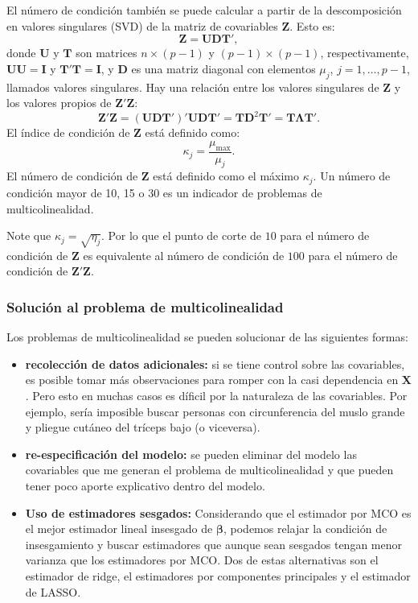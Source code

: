 \documentclass[
]{article}
\begin{document}
El número de condición también se puede calcular a partir de la descomposición en valores singulares (SVD) de la matriz de covariables \(\boldsymbol Z\). Esto es:
\[
\boldsymbol Z=\boldsymbol U\boldsymbol D\boldsymbol T',
\]
donde \(\boldsymbol U\) y \(\boldsymbol T\) son matrices \(n\times (p-1)\) y \((p-1)\times (p-1)\), respectivamente, \(\boldsymbol U\boldsymbol U= \boldsymbol I\) y \(\boldsymbol T'\boldsymbol T= \boldsymbol I\), y \(\boldsymbol D\) es una matriz diagonal con elementos \(\mu_{j}\), \(j=1,\ldots,p-1\), llamados valores singulares. Hay una relación entre los valores singulares de \(\boldsymbol Z\) y los valores propios de \(\boldsymbol Z'\boldsymbol Z\):
\[
\boldsymbol Z'\boldsymbol Z= (\boldsymbol U\boldsymbol D\boldsymbol T')'\boldsymbol U\boldsymbol D\boldsymbol T' = \boldsymbol T\boldsymbol D^2\boldsymbol T' = \boldsymbol T\boldsymbol \Lambda\boldsymbol T'.
\]
El índice de condición de \(\boldsymbol Z\) está definido como:
\[
\kappa_{j} = \frac{\mu_{\mbox{max}}}{\mu_{j}}.
\]
El número de condición de \(\boldsymbol Z\) está definido como el máximo \(\kappa_{j}\). Un número de condición mayor de 10, 15 o 30 es un indicador de problemas de multicolinealidad.

Note que \(\kappa_{j} = \sqrt{\eta_{j}}\). Por lo que el punto de corte de \(10\) para el número de condición de \(\boldsymbol Z\) es equivalente al número de condición de \(100\) para el número de condición de \(\boldsymbol Z'\boldsymbol Z\).

\subsubsection{Solución al problema de multicolinealidad}\label{soluciuxf3n-al-problema-de-multicolinealidad}

Los problemas de multicolinealidad se pueden solucionar de las siguientes formas:

\begin{itemize}
\item
  \textbf{recolección de datos adicionales:} si se tiene control sobre las covariables, es posible tomar más observaciones para romper con la casi dependencia en \(\boldsymbol X\). Pero esto en muchas casos es díficil por la naturaleza de las covariables. Por ejemplo, sería imposible buscar personas con circunferencia del muslo grande y pliegue cutáneo del tríceps bajo (o viceversa).
\item
  \textbf{re-especificación del modelo:} se pueden eliminar del modelo las covariables que me generan el problema de multicolinealidad y que pueden tener poco aporte explicativo dentro del modelo.
\item
  \textbf{Uso de estimadores sesgados:} Considerando que el estimador por MCO es el mejor estimador lineal insesgado de \(\boldsymbol \beta\), podemos relajar la condición de insesgamiento y buscar estimadores que aunque sean sesgados tengan menor varianza que los estimadores por MCO. Dos de estas alternativas son el estimador de ridge, el estimadores por componentes principales y el estimador de LASSO.
\end{itemize}
\end{document}
